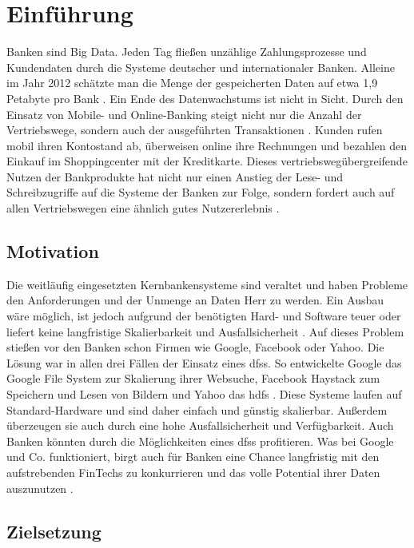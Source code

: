 \documentclass[12pt,oneside,a4paper,parskip]{scrbook}
\begin{document}
\chapter{Einführung}\label{ch:intro}
Banken sind Big Data. Jeden Tag fließen unzählige Zahlungsprozesse und Kundendaten durch die Systeme deutscher und internationaler Banken. Alleine im Jahr 2012 schätzte man die Menge der gespeicherten Daten auf etwa 1,9 Petabyte pro Bank \cite{datanami}. Ein Ende des Datenwachstums ist nicht in Sicht. Durch den Einsatz von Mobile- und Online-Banking steigt nicht nur die Anzahl der Vertriebswege, sondern auch der ausgeführten Transaktionen \cite{DBBigData}. Kunden rufen mobil ihren Kontostand ab, überweisen online ihre Rechnungen und bezahlen den Einkauf im Shoppingcenter mit der Kreditkarte. Dieses vertriebswegübergreifende Nutzen der Bankprodukte hat nicht nur einen Anstieg der Lese- und Schreibzugriffe auf die Systeme der Banken zur Folge, sondern fordert auch auf allen Vertriebswegen eine ähnlich gutes Nutzererlebnis \cite{bankwirtschaft}.

\section{Motivation}
Die weitläufig eingesetzten Kernbankensysteme sind veraltet und haben Probleme den Anforderungen und der Unmenge an Daten Herr zu werden. Ein Ausbau wäre möglich, ist jedoch aufgrund der benötigten Hard- und Software teuer oder liefert keine langfristige Skalierbarkeit und Ausfallsicherheit \cite{herzKernbankensystem}. Auf dieses Problem stießen vor den Banken schon Firmen wie Google, Facebook oder Yahoo. Die Lösung war in allen drei Fällen der Einsatz eines \acp{dfs}. So entwickelte Google das Google File System \cite{GFS} zur Skalierung ihrer Websuche, Facebook Haystack \cite{haystack} zum Speichern und Lesen von Bildern und Yahoo das \ac{hdfs} \cite{hdfs}. Diese Systeme laufen auf Standard-Hardware und sind daher einfach und günstig skalierbar. Außerdem überzeugen sie auch durch eine hohe Ausfallsicherheit und Verfügbarkeit. Auch Banken könnten durch die Möglichkeiten eines \acp{dfs} profitieren. Was bei Google und Co. funktioniert, birgt auch für Banken eine Chance langfristig mit den aufstrebenden FinTechs zu konkurrieren und das volle Potential ihrer Daten auszunutzen \cite{wiki:fintech}.

\section{Zielsetzung}
\end{document}
